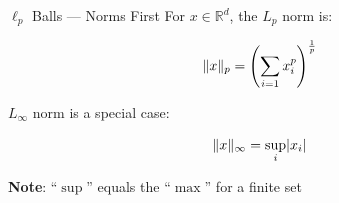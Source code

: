 \begin{frame}{$\ell_{p}$ Balls --- Norms First}
  For ${x \in \mathbb{R}^d}$, the $L_{p}$ norm is:

  \begin{equation}\label{eq:LpNorm}
    \lVert x\rVert_{p} = \left( \sum_{i=1} x_{i}^{p}  \right)^{\frac{1}{p}}
  \end{equation}

  $L_{\infty}$ norm is a special case:

  \begin{equation}\label{eq:LinftyNorm}
    \lVert x\rVert_{\infty} = \sup_{i} \lvert x_i\rvert
  \end{equation}

  \begin{center}
    \textbf{Note}: ``$\sup$'' equals the ``$\max$'' for a finite set
  \end{center}
\end{frame}

